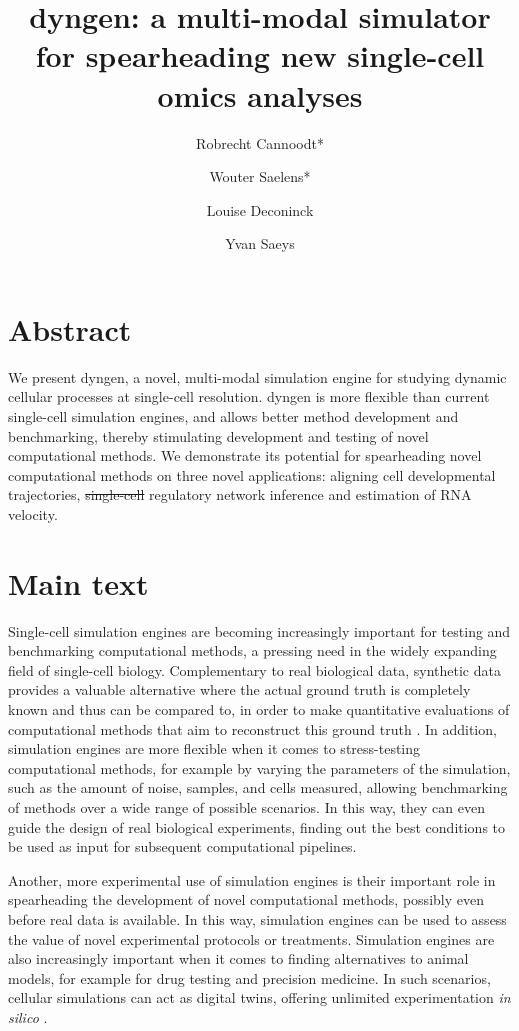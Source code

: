 \documentclass[
  table,
  10pt,
  a4paper]{article}
\title{dyngen: a multi-modal simulator for spearheading new single-cell
omics analyses}
\author{Robrecht Cannoodt* \and Wouter Saelens* \and Louise
Deconinck \and Yvan Saeys}
\date{\DIFdelbegin \DIFdel{14 September 2020}\DIFdelend \DIFaddbegin \DIFadd{29 March 2021}\DIFaddend }
\providecommand{\DIFaddtex}[1]{{\protect\color{blue}\uwave{#1}}} %
\providecommand{\DIFdeltex}[1]{{\protect\color{red}\sout{#1}}}                      %
\providecommand{\DIFaddbegin}{} %
\providecommand{\DIFaddend}{} %
\providecommand{\DIFdelbegin}{} %
\providecommand{\DIFdelend}{} %
\providecommand{\DIFadd}[1]{\texorpdfstring{\DIFaddtex{#1}}{#1}} %
\providecommand{\DIFdel}[1]{\texorpdfstring{\DIFdeltex{#1}}{}} %
\newcommand{\DIFscaledelfig}{0.5}
\newlength{\DIFdelgraphicswidth} %
\newlength{\DIFdelgraphicsheight} %
\newcommand{\DIFaddincludegraphics}[2][]{{\color{blue}\fbox{\DIFOincludegraphics[#1]{#2}}}} %
\newcommand{\DIFdelincludegraphics}[2][]{%
\sbox{\DIFdelgraphicsbox}{\DIFOincludegraphics[#1]{#2}}%
\settoboxwidth{\DIFdelgraphicswidth}{\DIFdelgraphicsbox} %
\settoboxtotalheight{\DIFdelgraphicsheight}{\DIFdelgraphicsbox} %
\scalebox{\DIFscaledelfig}{%
\parbox[b]{\DIFdelgraphicswidth}{\usebox{\DIFdelgraphicsbox}\\[-\baselineskip] \rule{\DIFdelgraphicswidth}{0em}}\llap{\resizebox{\DIFdelgraphicswidth}{\DIFdelgraphicsheight}{%
\setlength{\unitlength}{\DIFdelgraphicswidth}%
\begin{picture}(1,1)%
\thicklines\linethickness{2pt} %
{\color[rgb]{1,0,0}\put(0,0){\framebox(1,1){}}}%
{\color[rgb]{1,0,0}\put(0,0){\line( 1,1){1}}}%
{\color[rgb]{1,0,0}\put(0,1){\line(1,-1){1}}}%
\end{picture}%
}\hspace*{3pt}}} %
} %
\DeclareRobustCommand{\DIFaddbegin}{\DIFOaddbegin \let\includegraphics\DIFaddincludegraphics} %
\DeclareRobustCommand{\DIFaddend}{\DIFOaddend \let\includegraphics\DIFOincludegraphics} %
\DeclareRobustCommand{\DIFdelbegin}{\DIFOdelbegin \let\includegraphics\DIFdelincludegraphics} %
\DeclareRobustCommand{\DIFdelend}{\DIFOaddend \let\includegraphics\DIFOincludegraphics} %
\begin{document}
\maketitle

\hypertarget{abstract}{%
\section{Abstract}\label{abstract}}

We present dyngen, a novel, multi-modal simulation engine for studying
dynamic cellular processes at single-cell resolution. dyngen is more
flexible than current single-cell simulation engines, and allows better
method development and benchmarking, thereby stimulating development and
testing of novel computational methods. We demonstrate its potential for
spearheading novel computational methods on three novel applications:
aligning cell developmental trajectories, \DIFdelbegin \DIFdel{single-cell }\DIFdelend \DIFaddbegin \DIFadd{cell-specific }\DIFaddend regulatory
network inference and estimation of RNA velocity.

\hypertarget{main-text}{%
\section{Main text}\label{main-text}}

Single-cell simulation engines are becoming increasingly important for
testing and benchmarking computational methods, a pressing need in the
widely expanding field of single-cell biology. Complementary to real
biological data, synthetic data provides a valuable alternative where
the actual ground truth is completely known and thus can be compared to,
in order to make quantitative evaluations of computational methods that
aim to reconstruct this ground truth
\autocite{zappia_splattersimulationsinglecell_2017}. In addition,
simulation engines are more flexible when it comes to stress-testing
computational methods, for example by varying the parameters of the
simulation, such as the amount of noise, samples, and cells measured,
allowing benchmarking of methods over a wide range of possible
scenarios. In this way, they can even guide the design of real
biological experiments, finding out the best conditions to be used as
input for subsequent computational pipelines.
\DIFaddbegin 

\DIFaddend Another, more experimental use of simulation engines is their important
role in spearheading the development of novel computational methods,
possibly even before real data is available. In this way, simulation
engines can be used to assess the value of novel experimental protocols
or treatments. Simulation engines are also increasingly important when
it comes to finding alternatives to animal models, for example for drug
testing and precision medicine. In such scenarios, cellular simulations
can act as digital twins, offering unlimited experimentation \emph{in
silico} \autocite{bjornsson_digitaltwinspersonalize_2019}.
\end{document}
